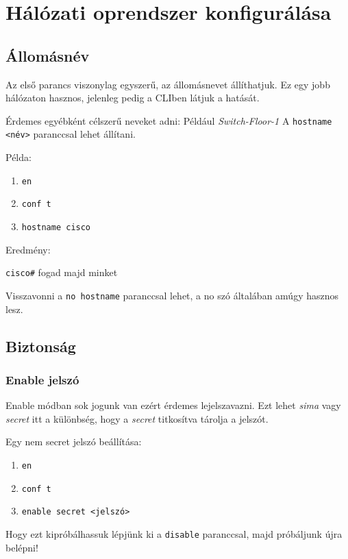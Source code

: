 \chapter{Hálózati oprendszer konfigurálása}
\section{Állomásnév}
Az első parancs viszonylag egyszerű, az állomásnevet állíthatjuk. Ez egy jobb hálózaton hasznos, jelenleg pedig a CLIben látjuk a hatását.

Érdemes egyébként célszerű neveket adni: Például \emph{Switch-Floor-1}
   A \verb|hostname <név>| paranccsal lehet állítani.

   Példa:
\begin{parancs}
   \begin{enumerate}
	\item \verb|en| 
	\item \verb|conf t|
	\item \verb|hostname cisco|
   \end{enumerate}
\end{parancs}
   Eredmény:

   \verb|cisco#| fogad majd minket


Visszavonni a \verb|no hostname| paranccsal lehet, a no szó általában amúgy hasznos lesz.

\section{Biztonság}

\subsection{Enable jelszó}
Enable módban sok jogunk van ezért érdemes lejelszavazni. Ezt lehet \emph{sima} vagy \emph{secret} itt a különbség, hogy a \emph{secret} titkosítva tárolja a jelszót.

Egy nem secret jelszó beállítása:
\begin{parancs}
\begin{enumerate}
	\item \verb|en| 
	\item \verb|conf t|
	\item \verb|enable secret <jelszó>|
\end{enumerate}

\end{parancs}
Hogy ezt kipróbálhassuk lépjünk ki a \verb|disable| paranccsal, majd próbáljunk újra belépni!

